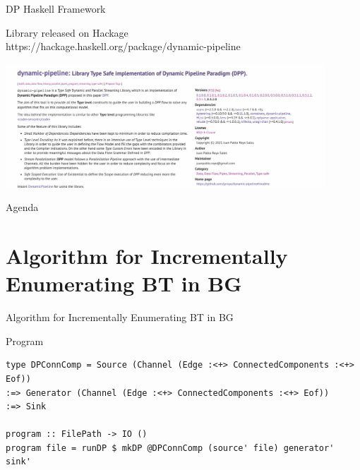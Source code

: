 \documentclass{beamer}
\begin{document}
  \begin{frame}[fragile]{DP Haskell Framework}
    \begin{block}{}
      Library released on Hackage \\
      https://hackage.haskell.org/package/dynamic-pipeline
      \begin{center}
        \includegraphics[width = 0.9\textwidth, height = 0.6\textheight]{dp-fw-hs}
      \end{center}  
    \end{block}
  \end{frame}

  \begin{frame}{Agenda}
    \section{Algorithm for Incrementally Enumerating BT in BG}
    \tableofcontents[currentsection]
  \end{frame}

  \begin{frame}[fragile]{Algorithm for Incrementally Enumerating BT in BG}
    \begin{block}{Program}
      \begin{verbatim}      
type DPConnComp = Source (Channel (Edge :<+> ConnectedComponents :<+> Eof))
:=> Generator (Channel (Edge :<+> ConnectedComponents :<+> Eof))
:=> Sink

program :: FilePath -> IO ()
program file = runDP $ mkDP @DPConnComp (source' file) generator' sink'
      \end{verbatim}
    \end{block}
  \end{frame}
\end{document}
